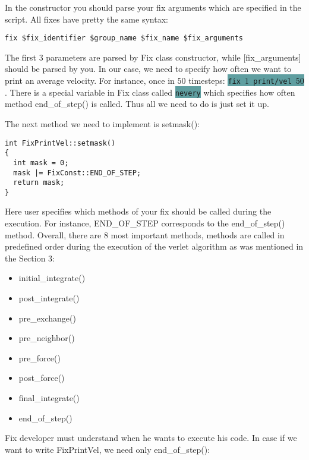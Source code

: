 \documentclass{article}
\newcommand{\code}[1]{\colorbox{cadetblue}{\color{white}\texttt{#1}}}
\begin{document}
In the constructor you should parse your fix arguments which are
specified in the script. All fixes have pretty the same syntax:

\begin{verbatim}
fix $fix_identifier $group_name $fix_name $fix_arguments
\end{verbatim}

The first $3$ parameters are parsed by Fix class constructor, while
[fix\_arguments] should be parsed by you. In our case, we need to
specify how often we want to print an average velocity. For instance,
once in $50$ timesteps: \code{fix $1$ print/vel $50$}. There is a special variable
in Fix class called \code{nevery} which specifies how often method
end\_of\_step() is called. Thus all we need to do is just set it up.

The next method we need to implement is setmask():
\begin{center}
\begin{verbatim}
int FixPrintVel::setmask()
{
  int mask = 0;
  mask |= FixConst::END_OF_STEP;
  return mask;
}
\end{verbatim}
\end{center}

Here user specifies which methods of your fix should be called during
the execution. For instance, END\_OF\_STEP corresponds to the
end\_of\_step() method. Overall, there are 8 most important methods,
methods are called in predefined order during the execution of the
verlet algorithm as was mentioned in the Section 3:

\begin{itemize}
\item initial\_integrate()
\item post\_integrate()
\item pre\_exchange()
\item pre\_neighbor()
\item pre\_force()
\item post\_force()
\item final\_integrate()
\item end\_of\_step()
\end{itemize}

Fix developer must understand when he wants to execute his code.  In
case if we want to write FixPrintVel, we need only end\_of\_step():
\end{document}
